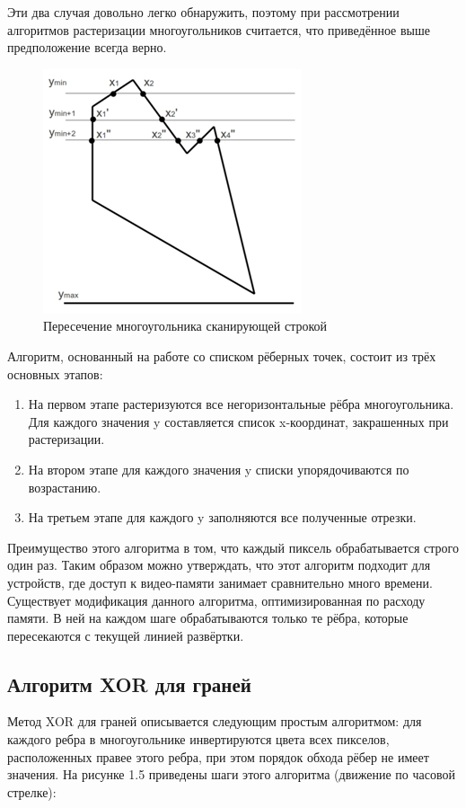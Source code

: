 \documentclass[12pt,a4paper,oneside]{report}
\begin{document}
 	Эти два случая довольно легко обнаружить, поэтому при рассмотрении алгоритмов растеризации многоугольников считается, что приведённое выше предположение всегда верно.
 	
 	\begin{figure}[H]
 		\centering
 		\includegraphics[scale=0.8]{poligon_intersect_line}
 		\caption{Пересечение многоугольника сканирующей строкой}
 	\end{figure}
 
 	 Алгоритм, основанный на работе со списком рёберных точек, состоит из трёх основных этапов:
 	\begin{enumerate}
 		\item На первом этапе растеризуются все негоризонтальные рёбра многоугольника. Для каждого значения y составляется список x-координат, закрашенных при растеризации.
 		\item На втором этапе для каждого значения y списки упорядочиваются по возрастанию.
 		\item На третьем этапе для каждого y заполняются все полученные отрезки.
 	\end{enumerate}
 	
 	 Преимущество этого алгоритма в том, что каждый пиксель обрабатывается строго один раз. Таким образом можно утверждать, что этот алгоритм подходит для устройств, где доступ к видео-памяти занимает сравнительно много времени.
 	Существует модификация данного алгоритма, оптимизированная по расходу памяти. В ней на каждом шаге обрабатываются только те рёбра, которые пересекаются с текущей линией развёртки.
 	
 	\subsection{Алгоритм XOR для граней}
 	 \quad Метод XOR для граней описывается следующим простым алгоритмом: для каждого ребра в многоугольнике инвертируются цвета всех пикселов, расположенных правее этого ребра, при этом порядок обхода рёбер не имеет значения. На рисунке 1.5 приведены шаги этого алгоритма (движение по часовой стрелке):
 	
\end{document}
